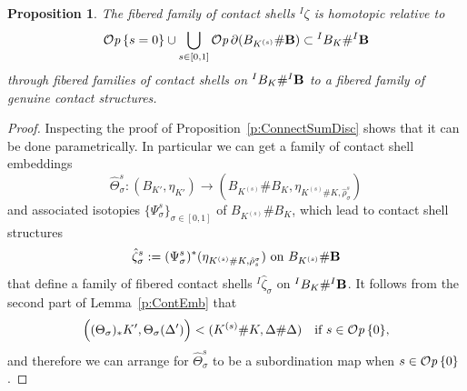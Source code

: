 \documentclass[12pt]{paper}
\theoremstyle{plain}
\newtheorem{prop}[theorem]{Proposition}
\theoremstyle{definition}
\newcommand{\wh}{\widehat}
\newcommand{\B}{{\bf B}}
\def\Op{{\mathcal O}{\it p}\,}
\numberwithin{figure}{section}
\begin{document}
\begin{prop}\label{p:LocalConnectSumDisc-param}
The fibered family of contact shells ${}^I \zeta$ is homotopic relative to
$$
	\Op\{s = 0\} \cup \bigcup_{s \in [0,1]} \Op \partial(B_{K^{(s)}}\# \B) \subset {}^I B_{K}\# {}^I \B
$$
through fibered families of contact shells on ${}^I B_{K}\# {}^I \B$ to a fibered family of genuine contact structures.
\end{prop}
\begin{proof}
	Inspecting the proof of Proposition~\ref{p:ConnectSumDisc}
	shows that it can be done parametrically.  In particular we can get a family of contact shell embeddings
	$$
		\wh\Theta_\sigma^s: (B_{K'}, \eta_{K'}) \to (B_{K^{(s)}}\#B_K, \eta_{K^{(s)}\#K, \hat\rho_\sigma^s})
	$$
	and associated isotopies $\{\Psi_\sigma^s\}_{\sigma \in [0,1]}$ of $B_{K^{(s)}} \# B_K$, which lead to
	contact shell structures
	$$
		\hat\zeta_\sigma^s := (\Psi_\sigma^s)^*(\eta_{K^{(s)}\#K, \hat\rho^\sigma_s}) \mbox{ on $B_{K^{(s)}} \# \B$}
	$$
	that define a family of fibered contact shells ${}^I \hat\zeta_\sigma$ on ${}^I B_{K}\#{}^I \B$.
	It follows from the second part of Lemma~\ref{p:ContEmb} that
	\begin{equation}\label{e:Embed2}
		\Big((\Theta_\sigma)_*K', \Theta_\sigma(\Delta')\Big) < (K^{(s)}\#K, \Delta \# \Delta) \quad\mbox{if $s \in \Op\{0\}$,}
	\end{equation}
	and therefore we can arrange for $\wh\Theta_\sigma^s$ to be a subordination map when $s \in \Op\{0\}$.
	

\end{proof}
\end{document}
